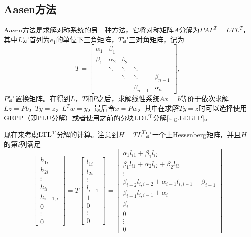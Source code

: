 \documentclass[a4paper,10pt]{ctexart}
\begin{document}
\iffalse
\subsection{Aasen方法}
Aasen方法是求解对称系统的另一种方法，它将对称矩阵$ A $分解为$ PAP^T = LTL^T $，其中$ L $是首列为$ e_1 $的单位下三角矩阵，$ T $是三对角矩阵，记为
\[
    T = 
    \begin{bmatrix} 
        \alpha_1 & \beta_1 & & &\\
        \beta_1 & \alpha_2 & \beta_2 & &\\
        & \ddots & \ddots & \ddots &\\
        & & \ddots & \ddots & \beta_{n-1}\\
        & & & \beta_{n-1} & \alpha_n
    \end{bmatrix},
\]
$ P $是置换矩阵。在得到$ L $，$ T $和$ P $之后，求解线性系统$ Ax=b $等价于依次求解$ Lz=Pb $，$ Ty=z $，$ L^Tw=y $，最后令$ x=Pw $，其中在求解$ Ty=z $时可以选择使用GEPP（即PLU分解）或者使用之前的分块$ {\rm LDL^T} $分解\ref{alg:LDLTP}。

现在来考虑$ {\rm LTL^T} $分解的计算。注意到$ H=TL^T $是一个上Hessenberg矩阵，并且$ H $的第$ i $列满足
\[
    \begin{bmatrix} 
        h_{1i} \\ h_{2i} \\ \vdots \\ h_{ii} \\ h_{i+1,i} \\ 0 \\ \vdots \\ 0
    \end{bmatrix} =
    T 
    \begin{bmatrix} 
        l_{1i} \\ l_{2i} \\ \vdots \\ l_{i-1} \\ 1 \\ 0 \\ \vdots \\ 0
    \end{bmatrix}=
    \begin{bmatrix} 
        \alpha_1 l_{i1} + \beta_1 l_{i2} \\
        \beta_1 l_{i1} + \alpha_2 l_{i2} + \beta_2 l_{i3} \\ \vdots \\ \beta_{i-2}l_{i,i-2}+\alpha_{i-1} l_{i,i-1} + \beta_{i-1} \\ \beta_{i-1}l_{i,i-1} + \alpha_i \\ \beta_{i} \\ 0 \\ \vdots \\ 0 
    \end{bmatrix} 
\]
\end{document}
